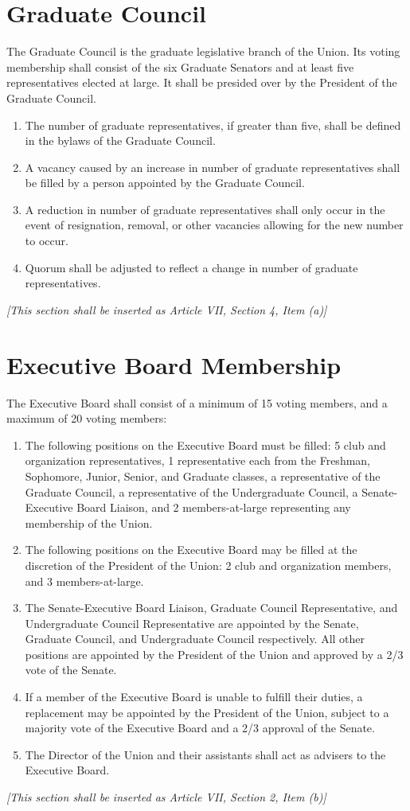 \documentclass{uniondoc}
\begin{document}
\section{Graduate Council}
The Graduate Council is the graduate legislative branch of the Union. Its voting membership shall consist of the six Graduate Senators and at least five representatives elected at large. It shall be presided over by the President of the Graduate Council.
\begin{enumerate}
	\item The number of graduate representatives, if greater than five, shall be defined in the bylaws of the Graduate Council.
	\item A vacancy caused by an increase in number of graduate representatives shall be filled by a person appointed by the Graduate Council.
	\item A reduction in number of graduate representatives shall only occur in the event of resignation, removal, or other vacancies allowing for the new number to occur.
	\item Quorum shall be adjusted to reflect a change in number of graduate representatives.
\end{enumerate}
\textit{[This section shall be inserted as Article VII, Section 4, Item (a)]}

\section{Executive Board Membership}
The Executive Board shall consist of a minimum of 15 voting members, and a maximum of 20 voting members:
\begin{enumerate}
	\item The following positions on the Executive Board must be filled: 5 club and organization representatives, 1 representative each from the Freshman, Sophomore, Junior, Senior, and Graduate classes, a representative of the Graduate Council, a representative of the Undergraduate Council, a Senate-Executive Board Liaison, and 2 members-at-large representing any membership of the Union.
	\item The following positions on the Executive Board may be filled at the discretion of the President of the Union: 2 club and organization members, and 3 members-at-large.
	\item The Senate-Executive Board Liaison, Graduate Council Representative, and Undergraduate Council Representative are appointed by the Senate, Graduate Council, and Undergraduate Council respectively. All other positions are appointed by the President of the Union and approved by a 2/3 vote of the Senate.
	\item If a member of the Executive Board is unable to fulfill their duties, a replacement may be appointed by the President of the Union, subject to a majority vote of the Executive Board and a 2/3 approval of the Senate.
	\item The Director of the Union and their assistants shall act as advisers to the Executive Board.
\end{enumerate}
\textit{[This section shall be inserted as Article VII, Section 2, Item (b)]}
\end{document}
